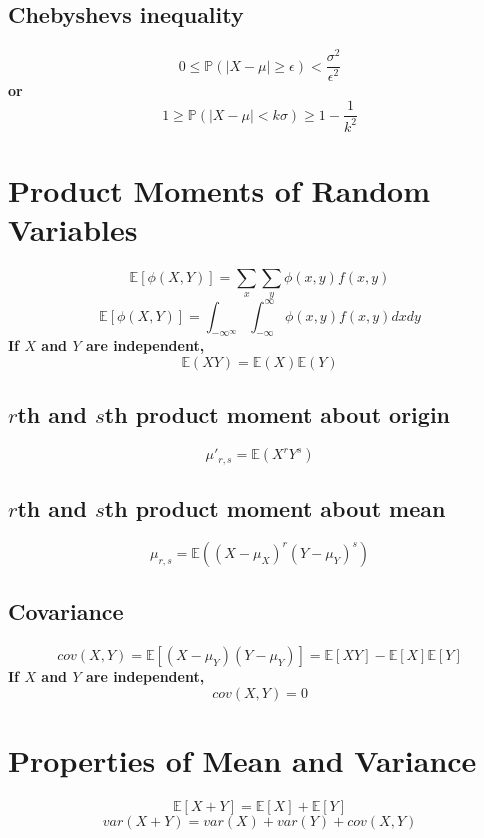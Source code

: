 \documentclass[titlepage]{article}
\begin{document}
        \subsection{Chebyshevs inequality}
            \paragraph{
                $$0\leq\mathbb{P}(|X-\mu|\geq \epsilon)<\frac{\sigma^2}{\epsilon^2}$$
                or
                $$1\geq \mathbb{P}(|X-\mu|<k\sigma)\geq1-\frac{1}{k^2}$$
            }
    \section{Product Moments of Random Variables}
        \paragraph{
            $$\mathbb{E}[\phi(X,Y)]=\sum_x \sum_y \phi(x,y)f(x,y)$$
            $$\mathbb{E}[\phi(X,Y)]=\int_{-\infty^\infty} \int_{-\infty}^\infty \phi(x,y)f(x,y)dxdy$$
            If $X$ and $Y$ are independent,
            $$\mathbb{E}(XY)=\mathbb{E}(X)\mathbb{E}(Y)$$
        }
        \subsection*{$r$th and $s$th product moment about origin}
            $$\mu'_{r,s}=\mathbb{E}(X^rY^s)$$
        \subsection*{$r$th and $s$th product moment about mean}
            $$\mu_{r,s}=\mathbb{E}((X-\mu_X)^r(Y-\mu_Y)^s)$$
        \subsection*{Covariance}
            \paragraph{
                $$cov(X,Y)=\mathbb{E}[(X-\mu_Y)(Y-\mu_Y)]=\mathbb{E}[XY]-\mathbb{E}[X]\mathbb{E}[Y]$$
                If $X$ and $Y$ are independent,
                $$cov(X,Y)=0$$
            }
    \section{Properties of Mean and Variance}
        \paragraph{
            $$\mathbb{E}[X+Y]=\mathbb{E}[X]+\mathbb{E}[Y]$$
            $$var(X+Y)=var(X)+var(Y)+cov(X,Y)$$
        }
\end{document}
